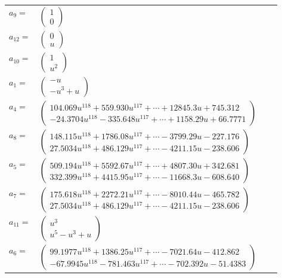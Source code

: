 \documentclass[1p]{elsarticle_modified}
\theoremstyle{definition}
\begin{document}
\begin{tabular}{m{7pt} m{180pt} m{7pt} m{180pt} }
\flushright $a_{9}=$&$\begin{pmatrix}1\\0\end{pmatrix}$ \\
\flushright $a_{12}=$&$\begin{pmatrix}0\\u\end{pmatrix}$ \\
\flushright $a_{10}=$&$\begin{pmatrix}1\\u^2\end{pmatrix}$ \\
\flushright $a_{1}=$&$\begin{pmatrix}- u\\- u^3+u\end{pmatrix}$ \\
\flushright $a_{4}=$&$\begin{pmatrix}104.069 u^{118}+559.930 u^{117}+\cdots+12845.3 u+745.312\\-24.3704 u^{118}-335.648 u^{117}+\cdots+1158.29 u+66.7771\end{pmatrix}$ \\
\flushright $a_{8}=$&$\begin{pmatrix}148.115 u^{118}+1786.08 u^{117}+\cdots-3799.29 u-227.176\\27.5034 u^{118}+486.129 u^{117}+\cdots-4211.15 u-238.606\end{pmatrix}$ \\
\flushright $a_{5}=$&$\begin{pmatrix}509.194 u^{118}+5592.67 u^{117}+\cdots+4807.30 u+342.681\\332.399 u^{118}+4415.95 u^{117}+\cdots-11668.3 u-608.640\end{pmatrix}$ \\
\flushright $a_{7}=$&$\begin{pmatrix}175.618 u^{118}+2272.21 u^{117}+\cdots-8010.44 u-465.782\\27.5034 u^{118}+486.129 u^{117}+\cdots-4211.15 u-238.606\end{pmatrix}$ \\
\flushright $a_{11}=$&$\begin{pmatrix}u^3\\u^5- u^3+u\end{pmatrix}$ \\
\flushright $a_{6}=$&$\begin{pmatrix}99.1977 u^{118}+1386.25 u^{117}+\cdots-7021.64 u-412.862\\-67.9945 u^{118}-781.463 u^{117}+\cdots-702.392 u-51.4383\end{pmatrix}$ \\

\end{tabular}
\end{document}
